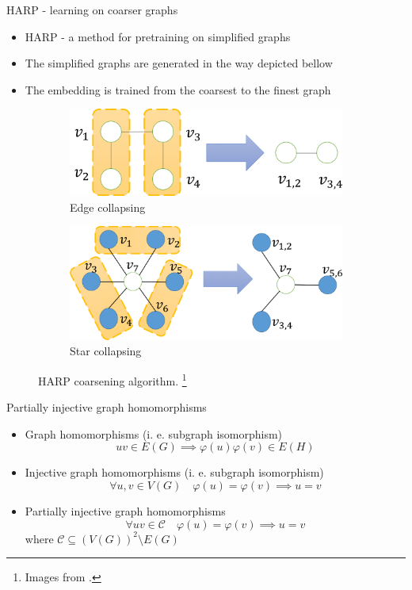 \documentclass[10pt]{beamer}
\begin{document}
\begin{frame}{HARP - learning on coarser graphs}
	\begin{itemize}
		\item HARP - a method for pretraining on simplified graphs
		\item The simplified graphs are generated in the way depicted bellow
		\item The embedding is trained from the coarsest to the finest graph
	\end{itemize}
	\begin{figure}
		\centering
		\begin{subfigure}[t]{0.38\textwidth}
			\centering
			\includegraphics[width=\textwidth]{images/edge_collapsing.png}
			\caption{Edge collapsing}
		\end{subfigure}
		\hspace{2em}
		\begin{subfigure}[t]{0.38\textwidth}
			\centering
			\includegraphics[width=\textwidth]{images/star_collapsing.png}
			\caption{Star collapsing}
		\end{subfigure}
		\caption{HARP coarsening algorithm. \footnote{Images from \cite{chen_harp_2018}.}}
	\end{figure}
\end{frame}

\begin{frame}{Partially injective graph homomorphisms}
	\begin{itemize}
		\item Graph homomorphisms (i. e. subgraph isomorphism)
\[ uv \in E \left( G \right) \implies \varphi \left( u \right) \varphi \left( v \right) \in E \left( H \right) \]
		\item Injective graph homomorphisms (i. e. subgraph isomorphism)
\[ \forall u, v \in V \left( G \right) \quad \varphi \left( u \right) = \varphi \left( v \right) \implies u = v \]
		\item Partially injective graph homomorphisms
\[ \forall uv \in \mathcal{C} \quad \varphi \left( u \right) = \varphi \left( v \right) \implies u = v \]
			where \( \mathcal{C} \subseteq \left( V \left( G \right) \right)^2 \setminus E \left( G \right) \)
	\end{itemize}
\end{frame}
\end{document}
